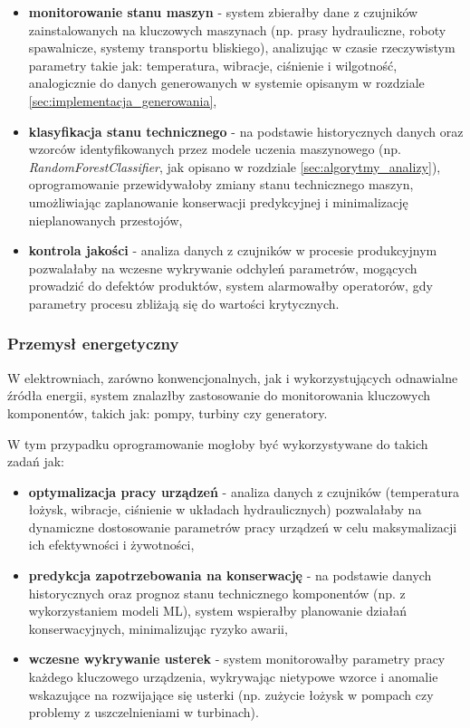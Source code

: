 \begin{itemize}
    \item \textbf{monitorowanie stanu maszyn} - system zbierałby dane z czujników zainstalowanych na kluczowych maszynach (np. prasy hydrauliczne, roboty spawalnicze, systemy transportu bliskiego),
    analizując w czasie rzeczywistym parametry takie jak: temperatura, wibracje, ciśnienie i wilgotność, analogicznie do danych generowanych w systemie opisanym w rozdziale \ref{sec:implementacja_generowania},
    \item \textbf{klasyfikacja stanu technicznego} - na podstawie historycznych danych oraz wzorców identyfikowanych przez modele uczenia maszynowego (np. \textit{RandomForestClassifier}, jak opisano w rozdziale \ref{sec:algorytmy_analizy}), oprogramowanie przewidywałoby zmiany stanu technicznego maszyn,
    umożliwiając zaplanowanie konserwacji predykcyjnej i minimalizację nieplanowanych przestojów,
    \item \textbf{kontrola jakości} - analiza danych z czujników w procesie produkcyjnym pozwalałaby na wczesne wykrywanie odchyleń parametrów, mogących prowadzić do defektów
    produktów, system alarmowałby operatorów, gdy parametry procesu zbliżają się do wartości krytycznych.
\end{itemize}

\subsubsection{Przemysł energetyczny}
\label{subsubsec:przemysl_energetyczny}

W elektrowniach, zarówno konwencjonalnych, jak i wykorzystujących odnawialne źródła energii, system znalazłby zastosowanie do monitorowania kluczowych komponentów, takich jak: pompy, turbiny czy generatory. 

\vspace{0.3em}

W tym przypadku oprogramowanie mogłoby być wykorzystywane do takich zadań jak:

\begin{itemize}
    \item \textbf{optymalizacja pracy urządzeń} - analiza danych z czujników (temperatura łożysk, wibracje, ciśnienie w układach hydraulicznych) pozwalałaby na dynamiczne dostosowanie parametrów pracy urządzeń w celu maksymalizacji ich efektywności i żywotności,
    \item \textbf{predykcja zapotrzebowania na konserwację} - na podstawie danych historycznych oraz prognoz stanu technicznego komponentów (np. z wykorzystaniem modeli ML), system wspierałby planowanie działań konserwacyjnych, minimalizując ryzyko awarii,
    \item \textbf{wczesne wykrywanie usterek} - system monitorowałby parametry pracy każdego kluczowego urządzenia, wykrywając nietypowe wzorce i anomalie wskazujące na rozwijające się usterki (np. zużycie łożysk w pompach czy problemy z uszczelnieniami w turbinach).
\end{itemize}

